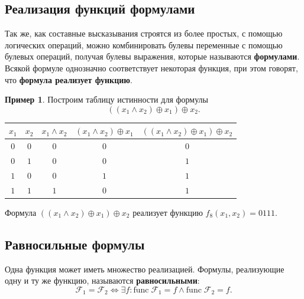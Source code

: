 \documentclass[a5paper, 11pt]{extarticle}
\theoremstyle{definition}
\newtheorem*{example*}{Пример}
\theoremstyle{definition}
\theoremstyle{definition}
\numberwithin{figure}{section}
\numberwithin{table}{section}
\begin{document}
\subsection{Реализация функций формулами}

Так же, как составные высказывания строятся из более простых, с помощью логических операций, можно комбинировать булевы переменные с помощью булевых операций, получая булевы выражения, которые называются \textbf{формулами}. Всякой формуле однозначно соответствует некоторая функция, при этом говорят, что \textbf{формула реализует функцию}.

\begin{example*}
    Построим таблицу истинности для формулы
    \[
        ((x_1 \land x_2) \oplus x_1) \oplus x_2.
    \]

    {
    \renewcommand*{\arraystretch}{1.5}
    \begin{longtable}{|c|c|c|c|c|}
        \hline
        \(x_1\) & \(x_2\) & \(x_1 \land x_2\) & \((x_1 \land x_2) \oplus x_1\) & \(((x_1 \land x_2) \oplus x_1) \oplus x_2\) \\
        \hline
        \(0\)   & \(0\)   & \(0\)             & \(0\)                          & \(0\)                                       \\
        \hline
        \(0\)   & \(1\)   & \(0\)             & \(0\)                          & \(1\)                                       \\
        \hline
        \(1\)   & \(0\)   & \(0\)             & \(1\)                          & \(1\)                                       \\
        \hline
        \(1\)   & \(1\)   & \(1\)             & \(0\)                          & \(1\)                                       \\
        \hline
    \end{longtable}
    }

    Формула \(((x_1 \land x_2) \oplus x_1) \oplus x_2\) реализует функцию \(f_8(x_1, x_2) = 0111\).
\end{example*}

\subsection{Равносильные формулы}

Одна функция может иметь множество реализацией. Формулы, реализующие одну и ту же функцию, называются \textbf{равносильными}:
\[
    \mathcal{F}_1 = \mathcal{F}_2
    \iff
    \exists f: \text{func} \; \mathcal{F}_1 = f \land \text{func} \; \mathcal{F}_2 = f.
\]
\end{document}
